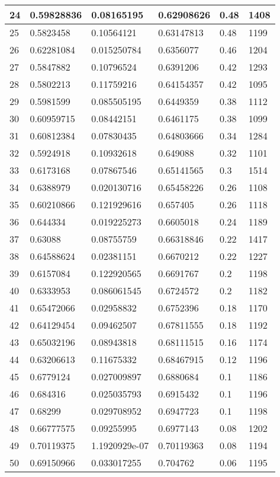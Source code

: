\begin{longtable}{|l|l|l|l|l|l|}
24 & 0.59828836 & 0.08165195 & 0.62908626 & 0.48 & 1408 \\ \hline 
25 & 0.5823458 & 0.10564121 & 0.63147813 & 0.48 & 1199 \\ \hline 
26 & 0.62281084 & 0.015250784 & 0.6356077 & 0.46 & 1204 \\ \hline 
27 & 0.5847882 & 0.10796524 & 0.6391206 & 0.42 & 1293 \\ \hline 
28 & 0.5802213 & 0.11759216 & 0.64154357 & 0.42 & 1095 \\ \hline 
29 & 0.5981599 & 0.085505195 & 0.6449359 & 0.38 & 1112 \\ \hline 
30 & 0.60959715 & 0.08442151 & 0.6461175 & 0.38 & 1099 \\ \hline 
31 & 0.60812384 & 0.07830435 & 0.64803666 & 0.34 & 1284 \\ \hline 
32 & 0.5924918 & 0.10932618 & 0.649088 & 0.32 & 1101 \\ \hline 
33 & 0.6173168 & 0.07867546 & 0.65141565 & 0.3 & 1514 \\ \hline 
34 & 0.6388979 & 0.020130716 & 0.65458226 & 0.26 & 1108 \\ \hline 
35 & 0.60210866 & 0.121929616 & 0.657405 & 0.26 & 1118 \\ \hline 
36 & 0.644334 & 0.019225273 & 0.6605018 & 0.24 & 1189 \\ \hline 
37 & 0.63088 & 0.08755759 & 0.66318846 & 0.22 & 1417 \\ \hline 
38 & 0.64588624 & 0.02381151 & 0.6670212 & 0.22 & 1227 \\ \hline 
39 & 0.6157084 & 0.122920565 & 0.6691767 & 0.2 & 1198 \\ \hline 
40 & 0.6333953 & 0.086061545 & 0.6724572 & 0.2 & 1182 \\ \hline 
41 & 0.65472066 & 0.02958832 & 0.6752396 & 0.18 & 1170 \\ \hline 
42 & 0.64129454 & 0.09462507 & 0.67811555 & 0.18 & 1192 \\ \hline 
43 & 0.65032196 & 0.08943818 & 0.68111515 & 0.16 & 1174 \\ \hline 
44 & 0.63206613 & 0.11675332 & 0.68467915 & 0.12 & 1196 \\ \hline 
45 & 0.6779124 & 0.027009897 & 0.6880684 & 0.1 & 1186 \\ \hline 
46 & 0.684316 & 0.025035793 & 0.6915432 & 0.1 & 1196 \\ \hline 
47 & 0.68299 & 0.029708952 & 0.6947723 & 0.1 & 1198 \\ \hline 
48 & 0.66777575 & 0.09255995 & 0.6977143 & 0.08 & 1202 \\ \hline 
49 & 0.70119375 & 1.1920929e-07 & 0.70119363 & 0.08 & 1194 \\ \hline 
50 & 0.69150966 & 0.033017255 & 0.704762 & 0.06 & 1195 \\ \hline 
\end{longtable}